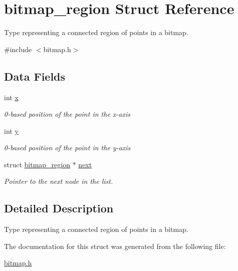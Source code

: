 \hypertarget{structbitmap__region}{
\section{bitmap\_\-region Struct Reference}
\label{structbitmap__region}
}


Type representing a connected region of points in a bitmap.  




{\ttfamily \#include $<$bitmap.h$>$}

\subsection*{Data Fields}
\begin{DoxyCompactItemize}
\item 
\hypertarget{structbitmap__region_ac1164a5047b0c9ace92478c836d16657}{
int \hyperlink{structbitmap__region_ac1164a5047b0c9ace92478c836d16657}{x}}
\label{structbitmap__region_ac1164a5047b0c9ace92478c836d16657}

\begin{DoxyCompactList}\small\item\em 0-\/based position of the point in the x-\/axis \item\end{DoxyCompactList}\item 
\hypertarget{structbitmap__region_ab8ce59ebe777199ba383a2e1d0d18f8b}{
int \hyperlink{structbitmap__region_ab8ce59ebe777199ba383a2e1d0d18f8b}{y}}
\label{structbitmap__region_ab8ce59ebe777199ba383a2e1d0d18f8b}

\begin{DoxyCompactList}\small\item\em 0-\/based position of the point in the y-\/axis \item\end{DoxyCompactList}\item 
\hypertarget{structbitmap__region_a0be812fb867e945ccfde9c5c7eb3bf9b}{
struct \hyperlink{structbitmap__region}{bitmap\_\-region} $\ast$ \hyperlink{structbitmap__region_a0be812fb867e945ccfde9c5c7eb3bf9b}{next}}
\label{structbitmap__region_a0be812fb867e945ccfde9c5c7eb3bf9b}

\begin{DoxyCompactList}\small\item\em Pointer to the next node in the list. \item\end{DoxyCompactList}\end{DoxyCompactItemize}


\subsection{Detailed Description}
Type representing a connected region of points in a bitmap. 

The documentation for this struct was generated from the following file:\begin{DoxyCompactItemize}
\item 
\hyperlink{bitmap_8h}{bitmap.h}\end{DoxyCompactItemize}
